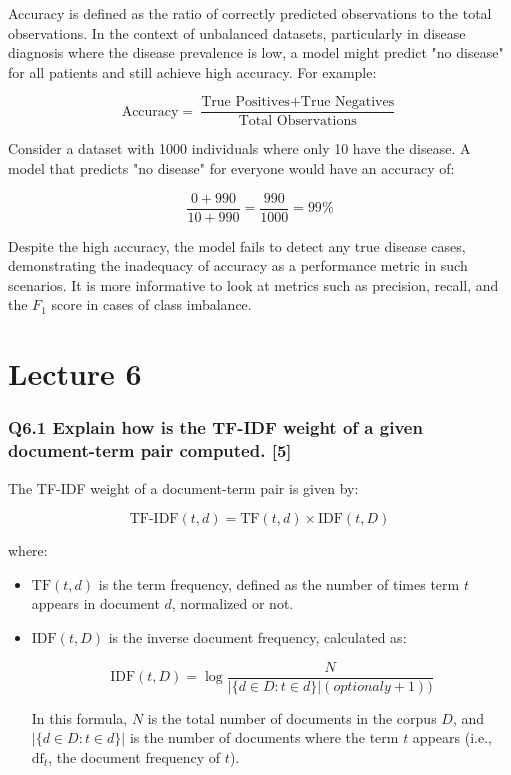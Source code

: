 \documentclass[11pt]{article}
\begin{document}
Accuracy is defined as the ratio of correctly predicted observations to the total observations. In the context of unbalanced datasets, particularly in disease diagnosis where the disease prevalence is low, a model might predict "no disease" for all patients and still achieve high accuracy. For example:

\[
\text{Accuracy} = \frac{\text{True Positives} + \text{True Negatives}}{\text{Total Observations}}
\]

Consider a dataset with 1000 individuals where only 10 have the disease. A model that predicts "no disease" for everyone would have an accuracy of:

\[
\frac{0 + 990}{10 + 990} = \frac{990}{1000} = 99\%
\]

Despite the high accuracy, the model fails to detect any true disease cases, demonstrating the inadequacy of accuracy as a performance metric in such scenarios. It is more informative to look at metrics such as precision, recall, and the \( F_1 \) score in cases of class imbalance.

\part{Lecture 6}

\section{Q6.1 Explain how is the TF-IDF weight of a given document-term pair computed. [5]}

The TF-IDF weight of a document-term pair is given by:

\[
\text{TF-IDF}(t,d) = \text{TF}(t,d) \times \text{IDF}(t,D)
\]

where:
\begin{itemize}
  \item \( \text{TF}(t,d) \) is the term frequency, defined as the number of times term \( t \) appears in document \( d \), normalized or not.
  \item \( \text{IDF}(t,D) \) is the inverse document frequency, calculated as:

  \[
  \text{IDF}(t,D) = \log \frac{N}{|\{d \in D : t \in d\}| (optionaly + 1))}
  \]

  In this formula, \( N \) is the total number of documents in the corpus \( D \), and \( |\{d \in D : t \in d\}| \) is the number of documents where the term \( t \) appears (i.e., \( \text{df}_t \), the document frequency of \( t \)).
\end{itemize}
\end{document}

